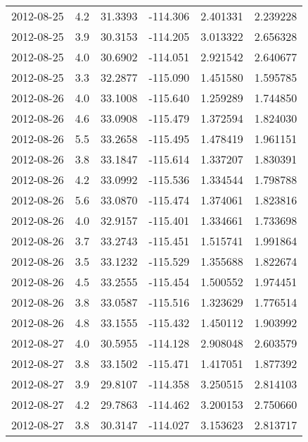 \begin{tabular}{lrrrrr}
2012-08-25 &       4.2 &  31.3393 &  -114.306 &         2.401331 &         2.239228 \\
2012-08-25 &       3.9 &  30.3153 &  -114.205 &         3.013322 &         2.656328 \\
2012-08-25 &       4.0 &  30.6902 &  -114.051 &         2.921542 &         2.640677 \\
2012-08-25 &       3.3 &  32.2877 &  -115.090 &         1.451580 &         1.595785 \\
2012-08-26 &       4.0 &  33.1008 &  -115.640 &         1.259289 &         1.744850 \\
2012-08-26 &       4.6 &  33.0908 &  -115.479 &         1.372594 &         1.824030 \\
2012-08-26 &       5.5 &  33.2658 &  -115.495 &         1.478419 &         1.961151 \\
2012-08-26 &       3.8 &  33.1847 &  -115.614 &         1.337207 &         1.830391 \\
2012-08-26 &       4.2 &  33.0992 &  -115.536 &         1.334544 &         1.798788 \\
2012-08-26 &       5.6 &  33.0870 &  -115.474 &         1.374061 &         1.823816 \\
2012-08-26 &       4.0 &  32.9157 &  -115.401 &         1.334661 &         1.733698 \\
2012-08-26 &       3.7 &  33.2743 &  -115.451 &         1.515741 &         1.991864 \\
2012-08-26 &       3.5 &  33.1232 &  -115.529 &         1.355688 &         1.822674 \\
2012-08-26 &       4.5 &  33.2555 &  -115.454 &         1.500552 &         1.974451 \\
2012-08-26 &       3.8 &  33.0587 &  -115.516 &         1.323629 &         1.776514 \\
2012-08-26 &       4.8 &  33.1555 &  -115.432 &         1.450112 &         1.903992 \\
2012-08-27 &       4.0 &  30.5955 &  -114.128 &         2.908048 &         2.603579 \\
2012-08-27 &       3.8 &  33.1502 &  -115.471 &         1.417051 &         1.877392 \\
2012-08-27 &       3.9 &  29.8107 &  -114.358 &         3.250515 &         2.814103 \\
2012-08-27 &       4.2 &  29.7863 &  -114.462 &         3.200153 &         2.750660 \\
2012-08-27 &       3.8 &  30.3147 &  -114.027 &         3.153623 &         2.813717 \\

\end{tabular}
